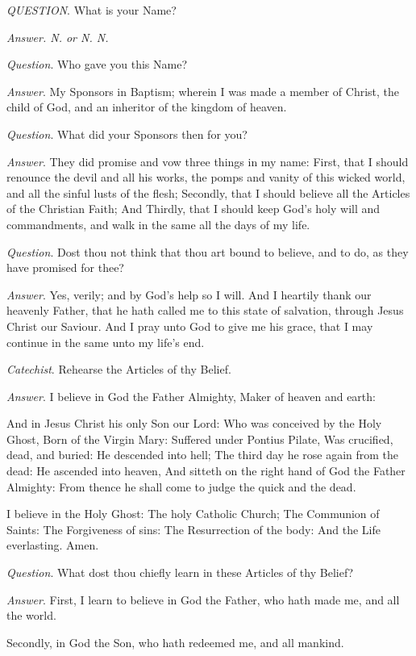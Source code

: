 \emph{Q}\emph{UESTION}.
What is your Name?

\emph{Answer. N. or N. N.}

\emph{Question}. Who gave you this Name?

\emph{Answer}. My Sponsors in Baptism; wherein I
was made a member of Christ, the child of God, and an inheritor of the
kingdom of heaven.

\emph{Question}. What did your Sponsors then for
you?

\emph{Answer}. They did promise and vow three things
in my name: First, that I should renounce the devil and all his works,
the pomps and vanity of this wicked world, and all the sinful lusts of
the flesh; Secondly, that I should believe all the Articles of the Christian
Faith; And Thirdly, that I should keep God's holy will and commandments,
and walk in the same all the days of my life.

\emph{Question}. Dost thou not think that thou art
bound to believe, and to do, as they have promised for thee?

\emph{Answer}. Yes, verily; and by God's help so
I will. And I heartily thank our heavenly Father, that he hath called
me to this state of salvation, through Jesus Christ our Saviour. And I
pray unto God to give me his grace, that I may continue in the same unto
my life's end.

\emph{Catechist}. Rehearse the Articles of thy Belief.

\emph{Answer}. I believe in God the Father Almighty,
Maker of heaven and earth:

And in Jesus Christ his only Son our Lord: Who was
conceived by the Holy Ghost, Born of the Virgin Mary: Suffered under Pontius
Pilate, Was crucified, dead, and buried: He descended into hell; The third
day he rose again from the dead: He ascended into heaven, And sitteth
on the right hand of God the Father Almighty: From thence he shall come
to judge the quick and the dead.

I believe in the Holy Ghost: The holy Catholic Church;
The Communion of Saints: The Forgiveness of sins: The Resurrection of
the body: And the Life everlasting. Amen.

\emph{Question}. What dost thou chiefly learn in
these Articles of thy Belief?

\emph{Answer}. First, I learn to believe in God the
Father, who hath made me, and all the world.

Secondly, in God the Son, who hath redeemed me, and
all mankind.

